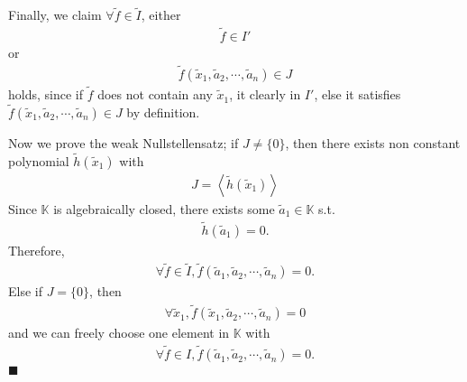 \documentclass[11pt]{book}
\begin{document}
Finally, we claim $\forall \tilde{f} \in \tilde{I}$, either
\begin{eqnarray}
\tilde{f} \in I'
\end{eqnarray}
or
\begin{eqnarray}
\tilde{f}(\tilde{x}_1 , \tilde{a}_2, \cdots, \tilde{a}_n) \in J
\end{eqnarray}
holds, since if $\tilde{f}$ does not contain any $\tilde{x}_1$, it clearly in $I'$, else it satisfies $\tilde{f}(\tilde{x}_1 , \tilde{a}_2, \cdots, \tilde{a}_n) \in J$ by definition.

Now we prove the weak Nullstellensatz; if $J \neq \{0\}$, then there exists non constant polynomial $\tilde{h}(\tilde{x}_1)$ with
\begin{eqnarray}
J = \left< \tilde{h}(\tilde{x}_1) \right>
\end{eqnarray}
Since $\mathbb{K}$ is algebraically closed, there exists some $\tilde{a}_1 \in \mathbb{K}$ s.t.
\begin{eqnarray}
\tilde{h}(\tilde{a}_1) = 0.
\end{eqnarray}
Therefore,
\begin{eqnarray}
\forall \tilde{f} \in \tilde{I}, \tilde{f}( \tilde{a}_1, \tilde{a}_2, \cdots, \tilde{a}_n) = 0.
\end{eqnarray}
Else if $J = \{0\}$, then
\begin{eqnarray}
\forall \tilde{x}_1, \tilde{f}( \tilde{x}_1, \tilde{a}_2, \cdots, \tilde{a}_n) = 0
\end{eqnarray}
and we can freely choose one element in $\mathbb{K}$ with
\begin{eqnarray}
\forall \tilde{f} \in I, \tilde{f}( \tilde{a}_1, \tilde{a}_2, \cdots, \tilde{a}_n) = 0.
\end{eqnarray}
$\blacksquare$
\end{document}

